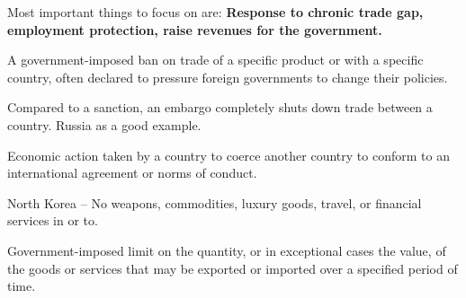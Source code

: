 Most important things to focus on are: \textbf{Response to chronic trade gap, 
employment protection, raise revenues for the government.}

\begin{definition}
    A government-imposed ban on trade of a specific product or with a specific country, 
    often declared to pressure foreign governments to change their policies.
\end{definition}

Compared to a sanction, an embargo completely shuts down trade between a country. Russia as a good example.

\begin{definition}
    Economic action taken by a country to coerce another country to conform to an 
    international agreement or norms of conduct.
\end{definition}

North Korea -- No weapons, commodities, luxury goods, travel, or financial services in or to.

\begin{definition}
    Government-imposed limit on the quantity, or in exceptional cases the value, 
    of the goods or services that may be exported or imported over a specified period of time.
\end{definition}

